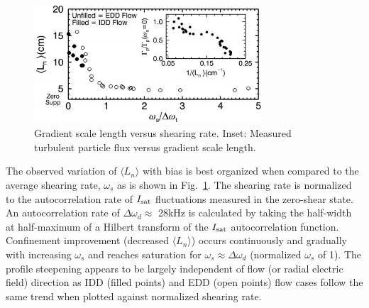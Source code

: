 \documentclass[aps,prl,amsmath,amssymb,preprint,superscriptaddress]{revtex4}
\begin{document}
\begin{figure}[!htbp]
\centerline{
\includegraphics[width=8.5cm]{shearandgrad.pdf}}
\caption{\label{fig:shearandgrad} Gradient scale length versus
  shearing rate. Inset: Measured turbulent particle flux versus
  gradient scale length.}
\end{figure}



The observed variation of $\langle L_{n} \rangle$ with bias is best
organized when compared to the average shearing rate, $\omega_s$ as is
shown in Fig.~\ref{fig:shearandgrad}.   The shearing rate is
normalized to the autocorrelation rate of $I_{\rm sat}$ fluctuations
measured in the zero-shear state.  An autocorrelation rate of $\Delta
\omega_{d} \approx $ 28kHz is calculated by taking the half-width at
half-maximum of a Hilbert transform of the $I_{\rm sat}$
autocorrelation function.  Confinement improvement (decreased $\langle
L_n \rangle$) occurs continuously and gradually with increasing
$\omega_{s}$ and reaches saturation for $\omega_{s} \approx \Delta
\omega_{d}$ (normalized $\omega_s$ of 1).  The profile steepening appears to be largely independent of flow (or radial electric field) direction as IDD (filled points) and EDD (open points) flow cases follow the same trend when plotted against normalized shearing rate.
\end{document}
